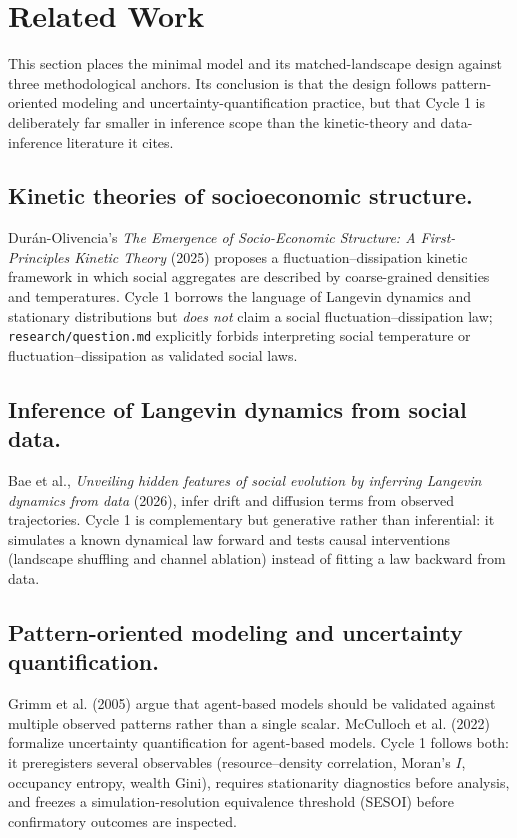 \documentclass[11pt,a4paper]{article}
\newcommand{\code}[1]{\texttt{#1}}
\begin{document}
\section{Related Work}
\label{sec:related}

This section places the minimal model and its matched-landscape design against
three methodological anchors. Its conclusion is that the design follows
pattern-oriented modeling and uncertainty-quantification practice, but that
Cycle 1 is deliberately far smaller in inference scope than the kinetic-theory
and data-inference literature it cites.

\subsection{Kinetic theories of socioeconomic structure.}
Dur\'an-Olivencia's \emph{The Emergence of Socio-Economic Structure: A
First-Principles Kinetic Theory} (2025) proposes a fluctuation--dissipation
kinetic framework in which social aggregates are described by coarse-grained
densities and temperatures. Cycle 1 borrows the language of Langevin dynamics
and stationary distributions but \emph{does not} claim a social
fluctuation--dissipation law; \code{research/question.md} explicitly forbids
interpreting social temperature or fluctuation--dissipation as validated social
laws.

\subsection{Inference of Langevin dynamics from social data.}
Bae et al., \emph{Unveiling hidden features of social evolution by inferring
Langevin dynamics from data} (2026), infer drift and diffusion terms from
observed trajectories. Cycle 1 is complementary but generative rather than
inferential: it simulates a known dynamical law forward and tests causal
interventions (landscape shuffling and channel ablation) instead of fitting a
law backward from data.

\subsection{Pattern-oriented modeling and uncertainty quantification.}
Grimm et al. (2005) argue that agent-based models should be validated against
multiple observed patterns rather than a single scalar. McCulloch et al. (2022)
formalize uncertainty quantification for agent-based models. Cycle 1 follows
both: it preregisters several observables (resource--density correlation,
Moran's $I$, occupancy entropy, wealth Gini), requires stationarity diagnostics
before analysis, and freezes a simulation-resolution equivalence threshold
(SESOI) before confirmatory outcomes are inspected.
\end{document}
